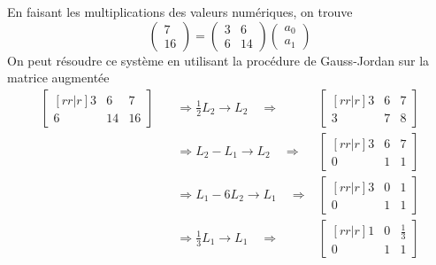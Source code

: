 En faisant les multiplications des valeurs numériques, on trouve
\[
\begin{pmatrix}
7 \\ 16
\end{pmatrix}
= \begin{pmatrix}
3 & 6 \\
6 & 14
\end{pmatrix}
\begin{pmatrix}
a_0 \\ a_1
\end{pmatrix}
\]
On peut résoudre ce système en utilisant la procédure de Gauss-Jordan sur la matrice augmentée
\[
\begin{matrix}
\begin{bmatrix}[rr|r]
3 & 6 & 7 \\
6 & 14 & 16
\end{bmatrix} & \quad\Rightarrow \frac12 L_2 \rightarrow  L_2 \quad \Rightarrow&
\begin{bmatrix}[rr|r]
3 & 6 & 7 \\
3 & 7 & 8
\end{bmatrix} \\[15pt]
 & \quad\Rightarrow L_2 - L_1 \rightarrow L_2 \quad \Rightarrow&
\begin{bmatrix}[rr|r]
3 & 6 & 7 \\
0 & 1 & 1
\end{bmatrix} \\[15pt]
 & \quad\Rightarrow L_1 - 6L_2 \rightarrow L_1 \quad \Rightarrow&
\begin{bmatrix}[rr|r]
3 & 0 & 1 \\
0 & 1 & 1
\end{bmatrix} \\[15pt]
 & \quad\Rightarrow \frac13 L_1 \rightarrow L_1 \quad \Rightarrow&
\begin{bmatrix}[rr|r]
1 & 0 & \frac13 \\
0 & 1 & 1
\end{bmatrix}
\end{matrix}
\]


